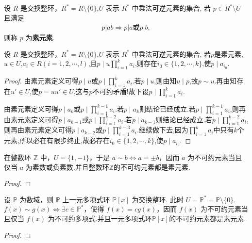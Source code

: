 \documentclass[../../main.tex]{subfiles}%
\begin{document}
\begin{definition}
设 \( R \) 是交换整环，\( R^* = R \setminus \{0\} \),\( U \) 表示 \( R^* \) 中乘法可逆元素的集合, 若 \( p \in R^* \setminus U \) 且满足
\begin{align*}
p|ab \Rightarrow p|a \text{或} p|b,
\end{align*}
则称 \( p \) 为\textbf{素元素}.
\end{definition}

\begin{proposition}\label{proposition:素元素整除性质1}
设 \( R \) 是交换整环，\( R^* = R \setminus \{0\} \),\( U \) 表示 \( R^* \) 中乘法可逆元素的集合, 若$p$是素元素,$u\in U$,$a_i\in R(i=1,2,\cdots,l)$,且$p\mid u\prod_{i=1}^{k}a_i$,则存在$i_0\in \{1,2,\cdots,k\}$,使$p\mid a_{i_0}$.
\end{proposition}
\begin{proof}

由素元素定义可得$p\mid u$或$p\mid \prod_{i=1}^{k}a_i$.若$p\mid u$,则由知$u\mid p$,故$p\sim u$.再由知存在$u'\in U$,使$p=uu'\in U$,这与$p$不可约矛盾!故下设$p\mid \prod_{i=1}^{k}a_i$.

由素元素定义可得$p\mid a_k$或$p\mid \prod_{i=1}^{k-1}a_i$.若$p\mid a_k$则结论已经成立.若$p\mid \prod_{i=1}^{k-1}a_i$,则再由素元素定义可得$p\mid a_{k-1}$或$p\mid \prod_{i=1}^{k-2}a_i$.若$p\mid a_{k-1}$则结论已经成立.若$p\mid \prod_{i=1}^{k-2}a_i$,则再由素元素定义可得$p\mid a_{k-2}$或$p\mid \prod_{i=1}^{k-3}a_i$.继续做下去,因为$\prod_{i=1}^{k}a_i$中只有$k$个元素,所以必在有限步终止,故必存在$i_0\in \{1,2,\cdots,k\}$,使$p\mid a_{i_0}$.

\end{proof}

\begin{example}\label{example:抽象代数--例2.4.2}
在整数环 \( \mathbb{Z} \) 中，\( U = \{1, -1\} \)，于是 \( a \sim b \iff a = \pm b \)，因而 \( a \) 为不可约元素当且仅当 \( a \) 为素数或负素数.并且整数环$\mathbb{Z}$的不可约元素都是素元素.
\end{example}
\begin{proof}

    

\end{proof}

\begin{example}\label{example:抽象代数--例2.4.3}
设 \( \mathbb{P} \) 为数域，则 \( \mathbb{P} \) 上一元多项式环 \( \mathbb{P}[x] \) 为交换整环. 此时 \( U = \mathbb{P}^* = \mathbb{P} \setminus \{0\} \). \( f(x) \sim g(x) \iff \exists c \in \mathbb{P}^* \)，使得 \( f(x) = cg(x) \)，因而 \( f(x) \) 为不可约元素当且仅当 \( f(x) \) 为不可约多项式.并且一元多项式环\( \mathbb{P}[x] \)的不可约元素都是素元素.
\end{example}
\begin{proof}



\end{proof}
\end{document}
